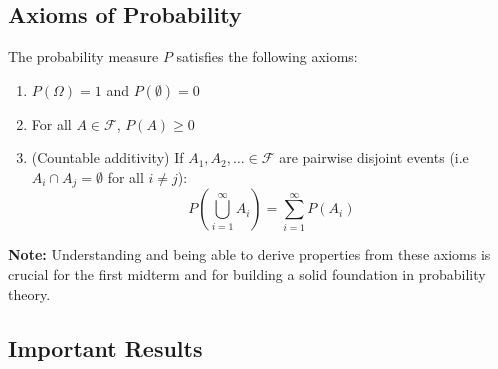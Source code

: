 \documentclass{article}
\begin{document}
\subsection*{Axioms of Probability}

The probability measure \( P \) satisfies the following axioms:
\begin{enumerate}
    \item \( P(\Omega) = 1 \) and \( P(\emptyset) = 0 \)
    \item For all \( A \in \mathcal{F} \), \( P(A) \geq 0 \)
    \item (Countable additivity) If \(A_1, A_2, \ldots \in \mathcal{F}\) are pairwise disjoint events (i.e $A_i \cap A_j = \emptyset$ for all $i \neq j$):
        \[
        P\left(\bigcup_{i=1}^{\infty} A_i\right) = \sum_{i=1}^{\infty} P(A_i)
        \]
\end{enumerate}

\textbf{Note:} Understanding and being able to derive properties from these axioms is crucial for the first midterm and for building a solid foundation in probability theory.

\subsection*{Important Results}
\end{document}
